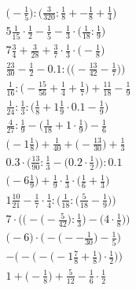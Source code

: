 \documentclass[8pt]{article}
\begin{document}
\begin{align}
\big(-\frac{1}{5}\big) : \big(\frac{3}{320} : \frac{1}{8} + -\frac{1}{8} + \frac{1}{4}\big) \\
5\frac{1}{15} \cdot \frac{1}{2} - \frac{1}{5} - \frac{1}{3} \cdot \big(\frac{1}{18} : \frac{1}{9}\big) \\
7\frac{3}{4} + \frac{3}{28} + \frac{3}{7} \cdot \frac{1}{3} \cdot \big(-\frac{1}{8}\big) \\
\frac{23}{30} - \frac{1}{2} - 0.1 : \Big(\big(-\frac{13}{42} - \frac{1}{7}\big)\Big) \\
\frac{1}{16} : \big(-\frac{15}{56} + \frac{1}{4} + \frac{1}{7}\big) + \frac{11}{18} - \frac{1}{9} \\
\frac{1}{24} : \frac{1}{3} : \big(\frac{1}{8} + 1\frac{1}{9} \cdot 0.1 - \frac{1}{9}\big) \\
\frac{4}{27} : \frac{1}{9} - \big(\frac{1}{18} + 1 \cdot \frac{1}{9}\big) - \frac{1}{6} \\
\big(-1\frac{1}{8}\big) + \frac{1}{40} + \big(-\frac{13}{30}\big) + \frac{1}{3} \\
0.3 \cdot \Big(\frac{13}{90} : \frac{1}{3} - \big(0.2 \cdot \frac{1}{2}\big)\Big) : 0.1 \\
\big(-6\frac{1}{9}\big) + \frac{1}{9} \cdot \frac{1}{3} \cdot \big(\frac{1}{6} + \frac{1}{3}\big) \\
1\frac{10}{21} - \frac{1}{7} \cdot \frac{1}{4} : \Big(\frac{1}{18} : \big(\frac{5}{18} - \frac{1}{9}\big)\Big) \\
7 \cdot \bigg(\Big(-\big(-\frac{5}{42}\big) : \frac{1}{3}\Big) - \Big(4 \cdot \frac{1}{8}\Big)\bigg) \\
\Big(-6\Big) \cdot \Big(-\big(--\frac{1}{30}\big) - \frac{1}{5}\Big) \\
-\bigg(-\Big(-\big(-1\frac{7}{8} + \frac{1}{8}\big) \cdot \frac{1}{2}\Big)\bigg) \\
1 + \big(-\frac{1}{8}\big) + \frac{5}{12} - \frac{1}{6} \cdot \frac{1}{2}
\end{align}
\end{document}
